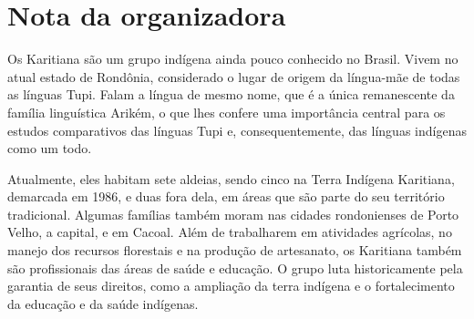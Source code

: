 
\chapter{Nota da organizadora}

\noindent{}Os Karitiana são um grupo indígena ainda pouco conhecido no Brasil. Vivem no atual estado de Rondônia, considerado o lugar de origem da língua-mãe de todas as línguas Tupi. Falam a língua de mesmo nome, que é a única remanescente da família linguística Arikém, o que lhes confere uma importância central para os estudos comparativos das línguas Tupi e, consequentemente, das línguas indígenas como um todo.


Atualmente, eles habitam sete aldeias, sendo cinco na Terra Indígena Karitiana, demarcada em 1986, e duas fora dela, em áreas que são parte do seu território tradicional. Algumas famílias também moram nas cidades rondonienses de Porto Velho, a capital, e em Cacoal. Além de trabalharem em atividades agrícolas, no manejo dos recursos florestais e na produção de artesanato, os Karitiana também são profissionais das áreas de saúde e educação. O grupo luta historicamente pela garantia de seus direitos, como a ampliação da terra indígena e o fortalecimento da educação e da saúde indígenas.
